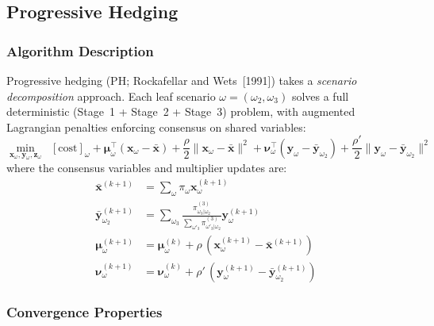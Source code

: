 \documentclass[11pt]{article}
\begin{document}
\subsection{Progressive Hedging}\label{sec:ph}

\subsubsection{Algorithm Description}

Progressive hedging (PH; Rockafellar and Wets~[1991]) takes a
\emph{scenario decomposition} approach. Each leaf scenario
$\omega = (\omega_2, \omega_3)$ solves a full deterministic
(Stage~1 + Stage~2 + Stage~3) problem, with augmented Lagrangian
penalties enforcing consensus on shared variables:
\begin{equation}\label{eq:ph}
  \min_{\mathbf{x}_\omega, \mathbf{y}_\omega, \mathbf{z}_\omega}
  \;\; [\text{cost}]_\omega
  + \boldsymbol{\mu}^\top_\omega(\mathbf{x}_\omega - \bar{\mathbf{x}})
  + \frac{\rho}{2}\|\mathbf{x}_\omega - \bar{\mathbf{x}}\|^2
  + \boldsymbol{\nu}^\top_\omega
    (\mathbf{y}_\omega - \bar{\mathbf{y}}_{\omega_2})
  + \frac{\rho'}{2}
    \|\mathbf{y}_\omega - \bar{\mathbf{y}}_{\omega_2}\|^2
\end{equation}
where the consensus variables and multiplier updates are:
\begin{align}
  \bar{\mathbf{x}}^{(k+1)} &= \textstyle\sum_\omega
    \pi_\omega \mathbf{x}_\omega^{(k+1)}
  \label{eq:ph-consensus-x} \\
  \bar{\mathbf{y}}_{\omega_2}^{(k+1)} &=
    \textstyle\sum_{\omega_3}
    \frac{\pi^{(3)}_{\omega_3|\omega_2}}
    {\sum_{\omega'_3} \pi^{(3)}_{\omega'_3|\omega_2}}
    \mathbf{y}_{\omega}^{(k+1)}
  \label{eq:ph-consensus-y} \\
  \boldsymbol{\mu}_\omega^{(k+1)} &=
    \boldsymbol{\mu}_\omega^{(k)}
    + \rho\,(\mathbf{x}_\omega^{(k+1)} - \bar{\mathbf{x}}^{(k+1)})
  \label{eq:ph-dual-x} \\
  \boldsymbol{\nu}_\omega^{(k+1)} &=
    \boldsymbol{\nu}_\omega^{(k)}
    + \rho'\,(\mathbf{y}_\omega^{(k+1)} -
    \bar{\mathbf{y}}_{\omega_2}^{(k+1)})
  \label{eq:ph-dual-y}
\end{align}

\subsubsection{Convergence Properties}
\end{document}
